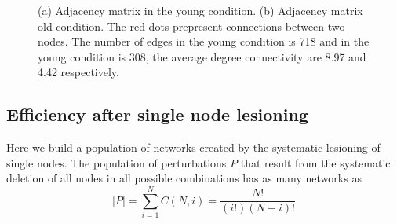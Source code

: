 \documentclass[12pt,a4paper]{article}
\begin{document}
\begin{figure}[H]
    \hfill
    \caption{\small (a) Adjacency matrix in the young condition.   
  \small (b) Adjacency matrix old condition. The red dots prepresent connections between two nodes. The 
  number of edges in the young condition is 718 and in the young condition is 308, the average degree connectivity are 8.97 and 4.42 respectively.}
    \label{fig:adjmat}
  \end{figure} 
 
\subsection{Efficiency after single node lesioning}
\label{ss:single}
Here we build a population of networks created by the systematic lesioning of single nodes. 
The population of perturbations $P$ that result from the systematic deletion of all nodes in all possible combinations has as many networks as  
\begin{equation*}
|P| = \sum_{i=1}^{N} C(N,i) = \frac{N!} {(i!)(N-i)!}
\label{eq:perurb}
\end{equation*}
\end{document}
